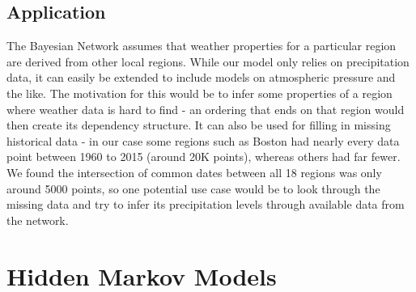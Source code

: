 \documentclass{article}
\begin{document}
\subsection{Application}
The Bayesian Network assumes that weather properties for a particular region are derived from other local regions. While our model only relies on precipitation data, it can easily be extended to include models on atmospheric pressure and the like. The motivation for this would be to infer some properties of a region where weather data is hard to find - an ordering that ends on that region would then create its dependency structure. It can also be used for filling in missing historical data - in our case some regions such as Boston had nearly every data point between 1960 to 2015 (around 20K points), whereas others had far fewer. We found the intersection of common dates between all 18 regions was only around 5000 points, so one potential use case would be to look through the missing data and try to infer its precipitation levels through available data from the network.

\section{Hidden Markov Models}


\onehalfspacing


\end{document}
